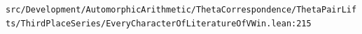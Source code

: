 \nolinkurl{src/Development/AutomorphicArithmetic/ThetaCorrespondence/ThetaPairLifts/ThirdPlaceSeries/EveryCharacterOfLiteratureOfVWin.lean:215}%
